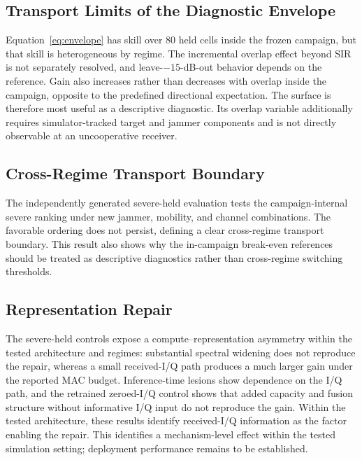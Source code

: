 \documentclass[letterpaper,journal]{IEEEtran}
\begin{document}
\subsection{Transport Limits of the Diagnostic Envelope}
Equation~\eqref{eq:envelope} has skill over 80 held cells inside the frozen
campaign, but that skill is heterogeneous by regime. The incremental overlap
effect beyond SIR is not separately resolved, and leave-$-15$-dB-out behavior
depends on the reference. Gain also increases rather than decreases with
overlap inside the campaign, opposite to the predefined directional
expectation. The surface is therefore most useful as a descriptive diagnostic.
Its overlap variable additionally requires
simulator-tracked target and jammer components and is not directly observable
at an uncooperative receiver.

\subsection{Cross-Regime Transport Boundary}
The independently generated severe-held evaluation tests the campaign-internal
severe ranking under new jammer, mobility, and channel combinations. The
favorable ordering does not persist, defining a clear cross-regime transport
boundary. This result also shows why the in-campaign break-even references
should be treated as descriptive diagnostics rather than cross-regime
switching thresholds.

\subsection{Representation Repair}
The severe-held controls expose a compute--representation asymmetry within the
tested architecture and regimes: substantial spectral widening does not
reproduce the repair, whereas a small received-I/Q path produces a much larger
gain under the reported MAC budget. Inference-time lesions show dependence
on the I/Q path, and the retrained zeroed-I/Q control shows that added capacity
and fusion structure without informative I/Q input do not reproduce the gain.
Within the tested architecture, these results identify received-I/Q
information as the factor enabling the repair. This identifies a mechanism-level
effect within the tested simulation setting; deployment performance remains to
be established.
\end{document}
